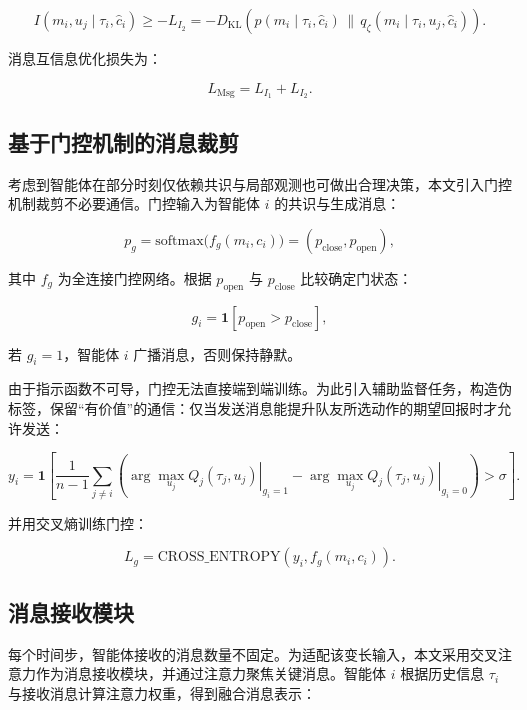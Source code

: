 \begin{equation}
I(m_i,u_j\mid \tau_i,\hat c_i)\ge -L_{I_2}
=
-D_{\text{KL}}\!\left(p(m_i\mid \tau_i,\hat c_i)\,\|\,q_{\zeta}(m_i\mid \tau_i,u_j,\hat c_i)\right).
\tag{10}
\end{equation}

消息互信息优化损失为：

\begin{equation}
L_{\text{Msg}}=L_{I_1}+L_{I_2}.
\tag{11}
\end{equation}

\subsection*{基于门控机制的消息裁剪}

考虑到智能体在部分时刻仅依赖共识与局部观测也可做出合理决策，本文引入门控机制裁剪不必要通信。门控输入为智能体 $i$ 的共识与生成消息：

\begin{equation}
p_g=\text{softmax}\!\big(f_g(m_i,c_i)\big)=(p_{\text{close}},p_{\text{open}}),
\tag{12}
\end{equation}

其中 $f_g$ 为全连接门控网络。根据 $p_{\text{open}}$ 与 $p_{\text{close}}$ 比较确定门状态：

\begin{equation}
g_i=\mathbf{1}[p_{\text{open}}>p_{\text{close}}],
\tag{13}
\end{equation}

若 $g_i=1$，智能体 $i$ 广播消息，否则保持静默。

由于指示函数不可导，门控无法直接端到端训练。为此引入辅助监督任务，构造伪标签，保留“有价值”的通信：仅当发送消息能提升队友所选动作的期望回报时才允许发送：

\begin{equation}
y_i=
\mathbf{1}\!\left[
\frac{1}{n-1}\sum_{j\ne i}
\left(
\left.\arg\max_{u_j}Q_j(\tau_j,u_j)\right|_{g_i=1}
-
\left.\arg\max_{u_j}Q_j(\tau_j,u_j)\right|_{g_i=0}
\right)>\sigma
\right].
\tag{14}
\end{equation}

并用交叉熵训练门控：

\[
L_g=\text{CROSS\_ENTROPY}\!\left(y_i,f_g(m_i,c_i)\right).
\]

\subsection*{消息接收模块}

每个时间步，智能体接收的消息数量不固定。为适配该变长输入，本文采用交叉注意力作为消息接收模块，并通过注意力聚焦关键消息。智能体 $i$ 根据历史信息 $\tau_i$ 与接收消息计算注意力权重，得到融合消息表示：


